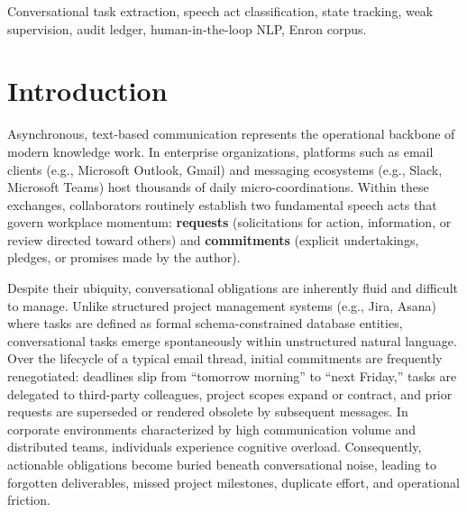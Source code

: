 \documentclass[conference]{IEEEtran}
\begin{document}
\begin{IEEEkeywords}
Conversational task extraction, speech act classification, state tracking, weak supervision, audit ledger, human-in-the-loop NLP, Enron corpus.
\end{IEEEkeywords}

\section{Introduction}
Asynchronous, text-based communication represents the operational backbone of modern knowledge work. In enterprise organizations, platforms such as email clients (e.g., Microsoft Outlook, Gmail) and messaging ecosystems (e.g., Slack, Microsoft Teams) host thousands of daily micro-coordinations. Within these exchanges, collaborators routinely establish two fundamental speech acts that govern workplace momentum: \textbf{requests} (solicitations for action, information, or review directed toward others) and \textbf{commitments} (explicit undertakings, pledges, or promises made by the author).

Despite their ubiquity, conversational obligations are inherently fluid and difficult to manage. Unlike structured project management systems (e.g., Jira, Asana) where tasks are defined as formal schema-constrained database entities, conversational tasks emerge spontaneously within unstructured natural language. Over the lifecycle of a typical email thread, initial commitments are frequently renegotiated: deadlines slip from ``tomorrow morning'' to ``next Friday,'' tasks are delegated to third-party colleagues, project scopes expand or contract, and prior requests are superseded or rendered obsolete by subsequent messages. In corporate environments characterized by high communication volume and distributed teams, individuals experience cognitive overload. Consequently, actionable obligations become buried beneath conversational noise, leading to forgotten deliverables, missed project milestones, duplicate effort, and operational friction.
\end{document}

